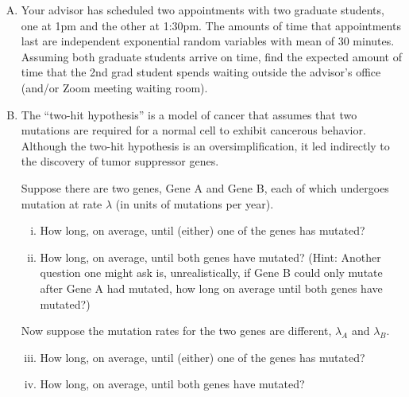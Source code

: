 \documentclass[12pt,letterpaper]{article}
\begin{document}
\begin{enumerate}[A.]


\item Your advisor has scheduled two appointments with two graduate students, one at 1pm and the other at 1:30pm. 
The amounts of time that appointments last are independent exponential random variables with mean of 30 minutes.
Assuming both graduate students arrive on time, find the expected amount of time that the 2nd grad student spends waiting outside the advisor's office (and/or Zoom meeting waiting room).


\item The ``two-hit hypothesis'' is a model of cancer that assumes that two mutations are required for a normal cell to exhibit cancerous behavior.
Although the two-hit hypothesis is an oversimplification, it led indirectly to the discovery of tumor suppressor genes.

Suppose there are two genes, Gene A and Gene B, each of which undergoes mutation at rate $\lambda$ (in units of mutations per year).  

\begin{enumerate}[i.]
    \item How long, on average, until (either) one of the genes has mutated? 
    \item How long, on average, until both genes have mutated? 
    (Hint: Another question one might ask is, unrealistically, if Gene B could only mutate after Gene A had mutated, how long on average until both genes have mutated?)
\end{enumerate}


Now suppose the mutation rates for the two genes are different, $\lambda_A$ and $\lambda_B$.

\begin{enumerate}[i.]
  \setcounter{enumii}{2}
  \item How long, on average, until (either) one of the genes has mutated? 
  \item How long, on average, until both genes have mutated?
\end{enumerate}


\end{enumerate}
\end{document}
